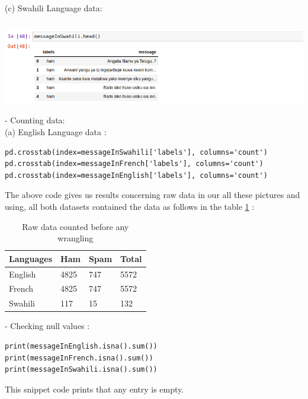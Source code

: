 \documentclass[12pt,a4paper, oneside]{book}
\begin{document}
(c) Swahili Language data: 
 
\includegraphics[height=4cm,width=1\linewidth]{CollectImages/headViewsSwahili} 
\\

- Counting data:\\
(a) English Language data :

\begin{lstlisting}[style=stylejupyter]
pd.crosstab(index=messageInSwahili['labels'], columns='count') 
pd.crosstab(index=messageInFrench['labels'], columns='count')
pd.crosstab(index=messageInEnglish['labels'], columns='count')
\end{lstlisting}

The above code gives us results concerning raw data in our   all these pictures and using, all both datasets contained the data as follows in the table \ref{tab:rawdatacollected} : \\
\begin{table}[h]
	\centering
\begin{tabular}{|p{3cm}|p{3.5cm}|p{3cm}|p{4cm}|} 
	\hline
	Languages & Ham  & Spam & Total\\
	\hline
	English & 4825 & 747  & 5572  \\
	\hline
	French&  4825 & 747 & 5572  \\ 
	\hline
	Swahili & 117 & 15 & 132\\
	\hline 
\end{tabular}
\caption{Raw data counted before any wrangling} 
\label{tab:rawdatacollected}
\end{table}

- Checking null values :
\begin{lstlisting}[style=stylejupyter]
print(messageInEnglish.isna().sum()) 
print(messageInFrench.isna().sum()) 
print(messageInSwahili.isna().sum()) 
\end{lstlisting}  
This snippet code prints that any entry is empty.\\
\end{document}
